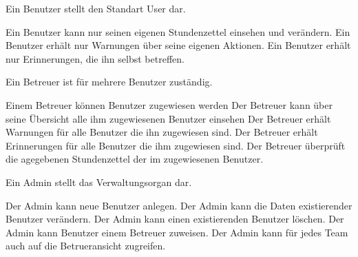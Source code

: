 \begin{requirements}
    Ein Benutzer stellt den Standart User dar.
    \begin{requirements}
         Ein Benutzer kann nur seinen eigenen Stundenzettel einsehen und verändern.
         Ein Benutzer erhält nur Warnungen über seine eigenen Aktionen.
         Ein Benutzer erhält nur Erinnerungen, die ihn selbst betreffen.
    \end{requirements}

        Ein Betreuer ist für mehrere Benutzer zuständig.
        \begin{requirements}
             Einem Betreuer können Benutzer zugewiesen werden
             Der Betreuer kann über seine Übersicht alle ihm zugewiesenen Benutzer einsehen
             Der Betreuer erhält Warnungen für alle Benutzer die ihn zugewiesen sind.
             Der Betreuer erhält Erinnerungen für alle Benutzer die ihm zugewiesen sind.
             Der Betreuer überprüft die agegebenen Stundenzettel der im zugewiesenen Benutzer.
        \end{requirements}

        Ein Admin stellt das Verwaltungsorgan dar.
        \begin{requirements}
             Der Admin kann neue Benutzer anlegen.
             Der Admin kann die Daten existierender Benutzer verändern.
             Der Admin kann einen existierenden Benutzer löschen.
             Der Admin kann Benutzer einem Betreuer zuweisen.
             Der Admin kann für jedes Team auch auf die Betrueransicht zugreifen.
        \end{requirements}
\end{requirements}

